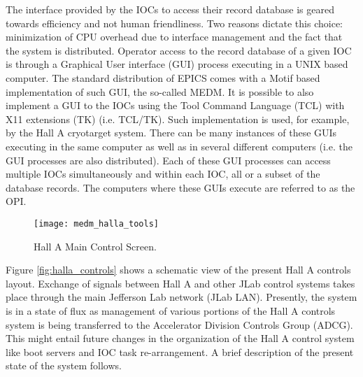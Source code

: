 The interface provided by the IOCs to access their record database is geared towards efficiency and not
human friendliness. Two reasons dictate this choice: minimization of CPU overhead due to
interface management and the fact that the system is distributed.
Operator access to the record database of a given IOC is through a Graphical User interface (GUI)
process executing in a UNIX based computer.
The standard distribution of EPICS comes with a Motif based implementation of such GUI, the
so-called MEDM. It is possible to also implement a GUI to the IOCs using the Tool Command Language
(TCL) with X11 extensions (TK) (i.e. TCL/TK). Such implementation is used, for example, by the
Hall A cryotarget system.
There can be many instances of these GUIs executing in the same computer as well as in several
different computers
(i.e. the GUI processes are also distributed).
Each of these GUI processes can access multiple IOCs simultaneously and within each IOC,
all or a subset of the database records. The computers where these GUIs execute are referred to as the OPI.

\begin{figure}[htb]
\begin{center}
\texttt{[image: medm\_halla\_tools]}
{\linespread{1.}
\caption[Controls: Hall A Main Control Screen]{Hall A Main Control Screen.}
\label{fig:halla_screen}}
\end{center}
\end{figure}

Figure \ref{fig:halla_controls} shows a schematic view of the present Hall A controls layout.
Exchange of signals between Hall A and other JLab control systems takes place through the 
main Jefferson Lab network (JLab LAN). Presently, 
the system is in a state of flux as management
of various portions of the Hall A controls system is being transferred to the Accelerator 
Division Controls Group (ADCG). This might entail future changes
in the organization of the Hall A control
system like boot servers and IOC task re-arrangement. A brief
description of the present state of the system follows.

